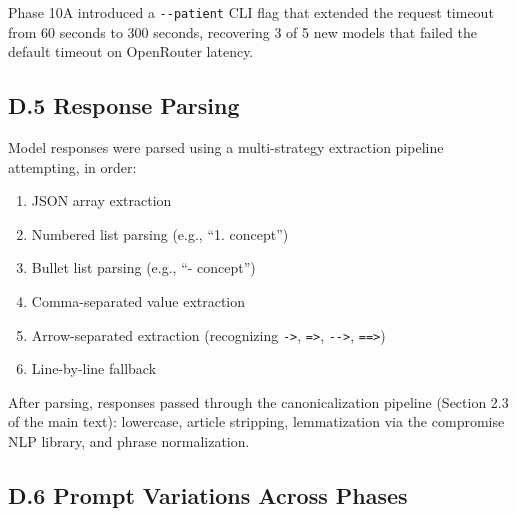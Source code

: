 Phase 10A introduced a \texttt{-\/-patient} CLI flag that extended the request timeout from 60 seconds to 300 seconds, recovering 3 of 5 new models that failed the default timeout on OpenRouter latency.

\subsection{D.5 Response Parsing}\label{d.5-response-parsing}

Model responses were parsed using a multi-strategy extraction pipeline attempting, in order:

\begin{enumerate}
\def\labelenumi{\arabic{enumi}.}
\tightlist
\item
  JSON array extraction
\item
  Numbered list parsing (e.g., ``1. concept'')
\item
  Bullet list parsing (e.g., ``- concept'')
\item
  Comma-separated value extraction
\item
  Arrow-separated extraction (recognizing \texttt{-\textgreater{}}, \texttt{=\textgreater{}}, \texttt{-\/-\textgreater{}}, \texttt{==\textgreater{}})
\item
  Line-by-line fallback
\end{enumerate}

After parsing, responses passed through the canonicalization pipeline (Section 2.3 of the main text): lowercase, article stripping, lemmatization via the compromise NLP library, and phrase normalization.

\subsection{D.6 Prompt Variations Across Phases}\label{d.6-prompt-variations-across-phases}

